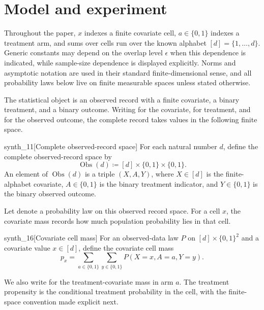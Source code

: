 \documentclass[11pt]{article}
\begin{document}
\section{Model and experiment}\label{sec:model}

Throughout the paper, \(x\) indexes a finite covariate cell, \(a\in\{0,1\}\) indexes a treatment arm, and sums over cells run over the known alphabet \([d]=\{1,\ldots,d\}\). Generic constants may depend on the overlap level \(\epsilon\) when this dependence is indicated, while sample-size dependence is displayed explicitly. Norms and asymptotic notation are used in their standard finite-dimensional sense, and all probability laws below live on finite measurable spaces unless stated otherwise.

The statistical object is an observed record with a finite covariate, a binary treatment, and a binary outcome. Writing  for the covariate,  for treatment, and  for the observed outcome, the complete record takes values in the following finite space.

\begin{definitionv}{synth_11}[Complete observed-record space]
For each natural number \(d\), define the complete observed-record space by
\[
\operatorname{Obs}(d)\coloneqq [d]\times\{0,1\}\times\{0,1\}.
\]
An element of \(\operatorname{Obs}(d)\) is a triple \((X,A,Y)\), where \(X\in[d]\) is the finite-alphabet covariate, \(A\in\{0,1\}\) is the binary treatment indicator, and \(Y\in\{0,1\}\) is the binary observed outcome.
\end{definitionv}

Let  denote a probability law on this observed record space. For a cell \(x\), the covariate mass  records how much population probability lies in that cell.

\begin{definitionv}{synth_16}[Covariate cell mass]
For an observed-data law \(P\) on \([d]\times\{0,1\}^2\) and a covariate value \(x\in[d]\), define the covariate cell mass
\[
p_x
=
\sum_{a\in\{0,1\}}\sum_{y\in\{0,1\}}
P(X=x,A=a,Y=y).
\]
\end{definitionv}

We also write  for the treatment-covariate mass in arm \(a\). The treatment propensity  is the conditional treatment probability in the cell, with the finite-space convention made explicit next.
\end{document}
